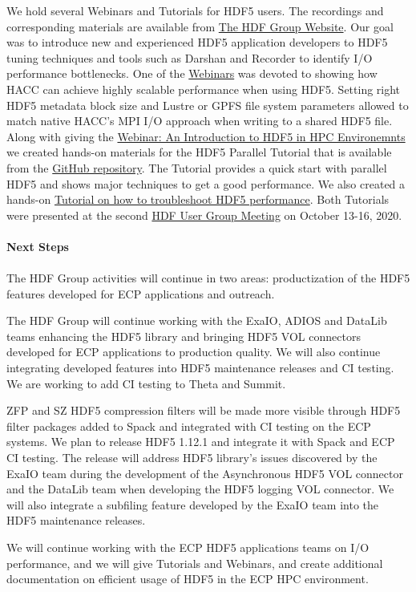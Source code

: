 We hold several Webinars and Tutorials for HDF5 users. The recordings and corresponding materials are available from \href{http://https://www.hdfgroup.org/category/webinar} {The HDF Group Website}. Our goal was to introduce new and experienced HDF5 application developers to HDF5 tuning techniques and tools such as Darshan and Recorder to identify I/O performance bottlenecks. One of the \href{https://www.hdfgroup.org/2020/08/a-study-of-hacc-io-benchmarks/}{Webinars} was devoted to showing how HACC can achieve highly scalable performance when using HDF5. Setting right HDF5 metadata block size and Lustre or GPFS file system parameters allowed to match native HACC's MPI I/O approach when writing to a shared HDF5 file.
Along with giving the \href{https://www.hdfgroup.org/2020/06/webinar-an-introduction-to-hdf5-in-hpc-environments-supporting-materials/}{Webinar: An Introduction to HDF5 in HPC Environemnts} we created hands-on materials for the HDF5 Parallel Tutorial that is available from the \href{https://github.com/HDFGroup/Tutorial/tree/main/Parallel-hands-on-tutorial}{GitHub repository}. The Tutorial provides a quick start with parallel HDF5 and shows major techniques to get a good performance. We also created a hands-on \href{https://github.com/HDFGroup/Tutorial/tree/main/HDF5-troubleshooting}{Tutorial on how to troubleshoot HDF5 performance}. Both Tutorials were presented at the second \href{https://www.hdfgroup.org/hug/2020-hug/hdf5-users-group-2020-agenda/}{HDF User Group Meeting} on October 13-16, 2020. 
\paragraph{Next Steps}
\paragraph{}
The HDF Group activities will continue in two areas: productization of the HDF5 features developed for ECP applications and outreach.

The HDF Group will continue working with the ExaIO, ADIOS and DataLib teams enhancing the HDF5 library and bringing HDF5 VOL connectors developed for ECP applications to production quality. We will also continue integrating developed features into HDF5 maintenance releases and CI testing. We are working to add CI testing to Theta and Summit.

ZFP and SZ HDF5 compression filters will be made more visible through HDF5 filter packages added to Spack and integrated with CI testing on the ECP systems. We plan to release HDF5 1.12.1 and integrate it with Spack and ECP CI testing. The release will address HDF5 library's issues discovered by the ExaIO team during the development of the Asynchronous HDF5 VOL connector and the DataLib team when developing the HDF5 logging VOL connector. We will also integrate a subfiling feature developed by the ExaIO team into the HDF5 maintenance releases.

We will continue working with the ECP HDF5 applications teams on I/O performance, and we will give Tutorials and Webinars, and create additional documentation on efficient usage of HDF5 in the ECP HPC environment.
